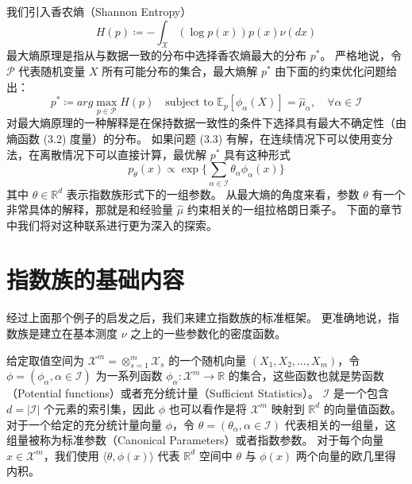 我们引入香农熵（Shannon Entropy）
\begin{equation}
    H(p) \coloneqq -\int_{\mathcal{X}} (\log{p(x)})p(x)\nu(dx)
\end{equation}
最大熵原理是指从与数据一致的分布中选择香农熵最大的分布 $p^*$。
严格地说，令 $\mathcal{P}$ 代表随机变量 $X$ 所有可能分布的集合，最大熵解 $p^*$ 由下面的约束优化问题给出：
\begin{equation}
    p^* \coloneqq arg\max_{p \in \mathcal{P}}H(p) \quad \text{subject to } \mathbb{E}_p[\phi_{\alpha}(X)] = \hat{\mu}_{\alpha}, \quad \forall \alpha \in \mathcal{I}
\end{equation}
对最大熵原理的一种解释是在保持数据一致性的条件下选择具有最大不确定性（由熵函数 (3.2) 度量）的分布。
如果问题 (3.3) 有解，在连续情况下可以使用变分法，在离散情况下可以直接计算，最优解 $p^*$ 具有这种形式
\begin{equation}
    p_{\theta}(x) \propto \exp{\{\sum_{\alpha \in \mathcal{I}}\theta_{\alpha}\phi_{\alpha}(x)\}}
\end{equation}
其中 $\theta \in \mathbb{R}^d$ 表示指数族形式下的一组参数。
从最大熵的角度来看，参数 $\theta$ 有一个非常具体的解释，那就是和经验量 $\hat{\mu}$ 约束相关的一组拉格朗日乘子。
下面的章节中我们将对这种联系进行更为深入的探索。

\section{指数族的基础内容}

经过上面那个例子的启发之后，我们来建立指数族的标准框架。
更准确地说，指数族是建立在基本测度 $\nu$ 之上的一些参数化的密度函数。

给定取值空间为 $\mathcal{X}^m = \otimes_{s = 1}^m\mathcal{X}_s$ 的一个随机向量 $(X_1, X_2, \dots, X_m)$，令 $\phi = (\phi_{\alpha}, \alpha \in \mathcal{I})$ 为一系列函数 $\phi_{\alpha}: \mathcal{X}^m \rightarrow \mathbb{R}$ 的集合，这些函数也就是势函数（Potential functions）或者充分统计量（Sufficient Statistics）。
$\mathcal{I}$ 是一个包含 $d = |\mathcal{I}|$ 个元素的索引集，因此 $\phi$ 也可以看作是将 $\mathcal{X}^m$ 映射到 $\mathbb{R}^d$ 的向量值函数。
对于一个给定的充分统计量向量 $\phi$，令 $\theta = (\theta_{\alpha}, \alpha \in \mathcal{I})$ 代表相关的一组量，这组量被称为标准参数（Canonical Parameters）或者指数参数。
对于每个向量 $x \in \mathcal{X}^m$，我们使用 $\langle \theta, \phi(x) \rangle$ 代表 $\mathbb{R}^d$ 空间中 $\theta$ 与 $\phi(x)$ 两个向量的欧几里得内积。

